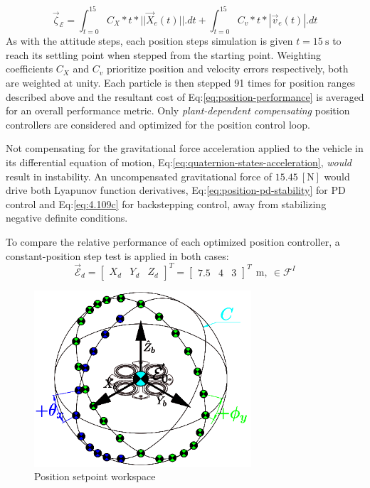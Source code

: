 \begin{equation}\label{eq:position-performance}
\vec{\zeta}_{\mathcal{E}}=\int_{t=0}^{15}C_{X}*t*||\vec{X}_e(t)||.dt+\int_{t=0}^{15}C_{v}*t*|\vec{v}_e(t)|.dt
\end{equation}
As with the attitude steps, each position steps simulation is given $t=15~\text{s}$ to reach its settling point when stepped from the starting point. Weighting coefficients $C_X$ and $C_v$ prioritize position and velocity errors respectively, both are weighted at unity. Each particle is then stepped 91 times for position ranges described above and the resultant cost of Eq:\ref{eq:position-performance} is averaged for an overall performance metric. Only \emph{plant-dependent compensating} position controllers are considered and optimized for the position control loop.
\par
Not compensating for the gravitational force acceleration applied to the vehicle in its differential equation of motion, Eq:\ref{eq:quaternion-states-acceleration}, \emph{would} result in instability. An uncompensated gravitational force of $15.45~[\text{N}]$ would drive both Lyapunov function derivatives, Eq:\ref{eq:position-pd-stability} for PD control and Eq:\ref{eq:4.109c} for backstepping control, away from stabilizing negative definite conditions. 
\par
To compare the relative performance of each optimized position controller, a constant-position step test is applied in both cases:
\begin{equation}\label{eq:position-step}
\vec{\mathcal{E}}_d=\begin{bmatrix}
X_d&
Y_d&
Z_d
\end{bmatrix}^T=\begin{bmatrix}
7.5&
4&
3
\end{bmatrix}^T~~\text{m},~\in\mathcal{F}^{I}
\end{equation}
\par
\begin{figure}[htbp]
\vspace{-16pt}
\centering
\includegraphics[width=0.72\textwidth]{figs/position-setpoint}
\vspace{-6pt}
\caption{Position setpoint workspace}
\label{fig:position-setpoint}
\vspace{-16pt}
\end{figure}
